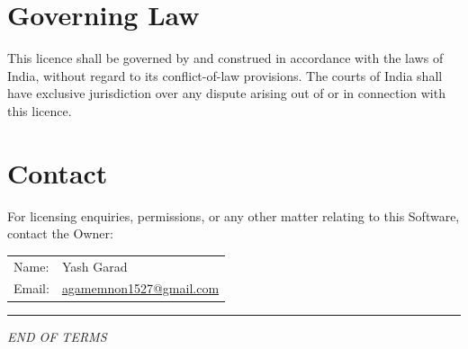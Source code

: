 \documentclass[11pt,a4paper]{article}
\makeatletter
\newcommand{\OwnerName}{Yash Garad}
\newcommand{\OwnerEmail}{agamemnon1527@gmail.com}
\makeatother
\begin{document}
\section{Governing Law}

This licence shall be governed by and construed in accordance with the laws
of India, without regard to its conflict-of-law provisions. The courts of
India shall have exclusive jurisdiction over any dispute arising out of or
in connection with this licence.

\section{Contact}

For licensing enquiries, permissions, or any other matter relating to this
Software, contact the Owner:

\begin{center}
\begin{tabular}{ll}
    Name:  & \OwnerName \\
    Email: & \href{mailto:\OwnerEmail}{\OwnerEmail} \\
\end{tabular}
\end{center}

\vspace{2em}
\noindent\rule{\linewidth}{0.6pt}

\begin{center}
    \small \itshape END OF TERMS
\end{center}
\end{document}
